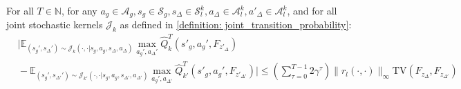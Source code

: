 \documentclass[10pt,a4paper]{amsart}
\def\E{\mathbb{E}}
\def\N{\mathbb{N}}
\begin{document}
\begin{lemma} For all $T\in\N$, for any $a_g\in\mathcal{A}_g,s_g\in\mathcal{S}_g, s_\Delta\in\mathcal{S}_l^{k}, a_\Delta \in \mathcal{A}_l^k, a'_\Delta \in \mathcal{A}_l^k$, and for all joint stochastic kernels $\mathcal{J}_k$ as defined in \cref{definition: joint_transition_probability}:\label{lemma: expectation Q lipschitz continuous wrt Fsdelta}
\begin{align*}
&\bigg|\E_{(s_g',s_\Delta')\sim\mathcal{J}_k(\cdot,\cdot|s_g,a_g,s_\Delta,a_\Delta)}\max_{a_g',a_\Delta'}\hat{Q}_k^T(s'_g,a_g',F_{z'_\Delta}) \\
&\!-\!\E_{(s_g',s_{\Delta'}')\sim\mathcal{J}_{k'}(\cdot,\cdot|s_g,a_g,s_{\Delta'},a_{\Delta'})}\max_{a_g',a_{\Delta'}}\hat{Q}_{k'}^T(s'_g, a_g', F_{z'_{\Delta'}})\bigg|\!\leq\!\left(\sum_{\tau=0}^{T-1}2\gamma^\tau\right)\!\|r_l(\cdot,\cdot)\|_\infty\mathrm{TV}\left(F_{z_\Delta}, F_{z_{\Delta'}}\right)
\end{align*}
\end{lemma}
\end{document}
